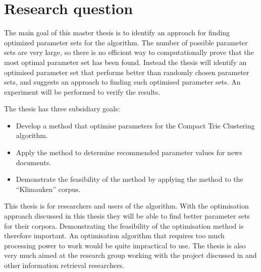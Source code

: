 

\section{Research question}

The main goal of this master thesis is to identify an approach for finding optimized parameter sets for the \CTC algorithm. The number of possible parameter sets are very large, so there is no efficient way to computationally prove that the most optimal parameter set has been found. Instead the thesis will identify an optimised parameter set that performs better than randomly chosen parameter sets, and suggests an approach to finding such optimised parameter sets. An experiment will be performed to verify the results.

The thesis has three subsidiary goals:
\begin{itemize}
	\item Develop a method that optimise parameters for the Compact Trie Clustering algorithm.
	\item Apply the method to determine recommended parameter values for news documents.
	\item Demonstrate the feasibility of the method by applying the method to the ``Klimauken'' corpus.
\end{itemize}

This thesis is for researchers and users of the \STC algorithm. With the optimisation approach discussed in this thesis they will be able to find better parameter sets for their corpora. Demonstrating the feasibility of the optimisation method is therefore important. An optimisation algorithm that requires too much processing power to work would be quite impractical to use. The thesis is also very much aimed at the research group working with the project discussed in  and other information retrieval researchers.

